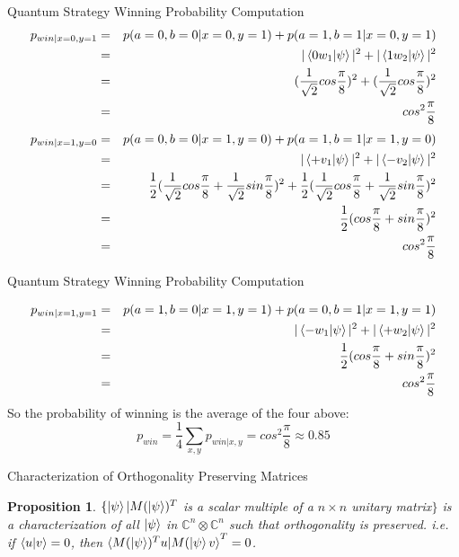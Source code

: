 \documentclass[handout, 10 pt]{beamer}
\newtheorem{prop}{Proposition}
\begin{document}
\begin{frame}{Quantum Strategy Winning Probability Computation}
\begin{eqnarray*}
p_{win|x=0,y=1}&=&p(a=0, b=0|x=0, y=1)+p(a=1, b=1|x=0, y=1)\\
&=&|\braket{0 w_1|\psi}|^2 + |\braket{1 w_2|\psi}|^2\\
&=&(\frac{1}{\sqrt{2}}cos\frac{\pi}{8})^2+(\frac{1}{\sqrt{2}}cos\frac{\pi}{8})^2\\
&=&cos^2 \frac{\pi}{8}
\end{eqnarray*}
\begin{eqnarray*}
p_{win|x=1,y=0}&=&p(a=0, b=0|x=1, y=0)+p(a=1, b=1|x=1, y=0)\\
&=&|\braket{+ v_1|\psi}|^2 + |\braket{- v_2|\psi}|^2\\
&=&\frac{1}{2}(\frac{1}{\sqrt{2}}cos\frac{\pi}{8}+\frac{1}{\sqrt{2}}sin\frac{\pi}{8})^2+\frac{1}{2}(\frac{1}{\sqrt{2}}cos\frac{\pi}{8}+\frac{1}{\sqrt{2}}sin\frac{\pi}{8})^2\\
&=&\frac{1}{2}(cos\frac{\pi}{8}+sin\frac{\pi}{8})^2\\
&=&cos^2 \frac{\pi}{8}
\end{eqnarray*}

\end{frame}

\begin{frame}{Quantum Strategy Winning Probability Computation}

\begin{eqnarray*}
p_{win|x=1,y=1}&=&p(a=1, b=0|x=1, y=1)+p(a=0, b=1|x=1, y=1)\\
&=&|\braket{- w_1|\psi}|^2 + |\braket{+ w_2|\psi}|^2\\
&=&\frac{1}{2}(cos\frac{\pi}{8}+sin\frac{\pi}{8})^2\\
&=&cos^2 \frac{\pi}{8}
\end{eqnarray*}
So the probability of winning is the average of the four above:
\begin{equation*}
    p_{win}=\frac{1}{4}\sum_{x,y}p_{win|x,y}=cos^2 \frac{\pi}{8} \approx 0.85
\end{equation*}

\end{frame}

\begin{frame}{Characterization of Orthogonality Preserving Matrices}
\begin{prop} \label{orthogonality preserving character}
$\{\ket{\psi}|M(\ket{\psi})^T$ is a scalar multiple of a $n \times n$ unitary matrix$\}$ is a characterization of all $\ket{\psi}$ in $\mathbb{C}^n \otimes \mathbb{C}^n$ such that orthogonality is preserved. i.e. if $\braket{u|v}=0$, then $\braket{M(\ket{\psi})^Tu|M(\ket{\psi}v}^T=0$.
\end{prop}


\end{frame}

\end{document}
